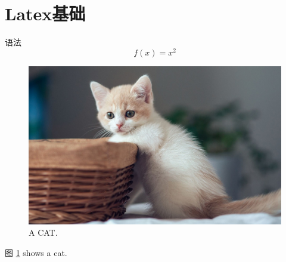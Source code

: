 \documentclass{article}
\begin{document}
  \section{Latex基础}
  语法
  \begin{equation}
    f(x) = x^2
  \end{equation}

  \begin{figure}
    \includegraphics[width=\linewidth]{image/qwe.jpg}
    \caption{A CAT.}
    \label{fig:cat1}
  \end{figure}
  
  图 \ref{fig:cat1} shows a cat.
\end{document}
